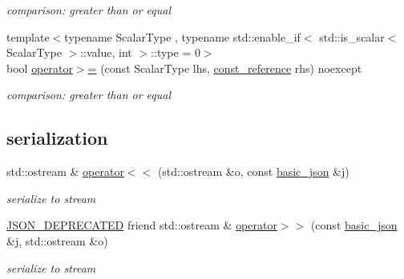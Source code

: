 \begin{DoxyCompactItemize}
\begin{DoxyCompactList}\small\item\em comparison\+: greater than or equal \end{DoxyCompactList}\item 
{\footnotesize template$<$typename Scalar\+Type , typename std\+::enable\+\_\+if$<$ std\+::is\+\_\+scalar$<$ Scalar\+Type $>$\+::value, int $>$\+::type  = 0$>$ }\\bool \hyperlink{classnlohmann_1_1basic__json_a5ee0e3e8afc7cbd932d6ed66418fa80a}{operator$>$=} (const Scalar\+Type lhs, \hyperlink{classnlohmann_1_1basic__json_a4057c5425f4faacfe39a8046871786ca}{const\+\_\+reference} rhs) noexcept
\begin{DoxyCompactList}\small\item\em comparison\+: greater than or equal \end{DoxyCompactList}\end{DoxyCompactItemize}
\subsection*{serialization}
\begin{DoxyCompactItemize}
\item 
std\+::ostream \& \hyperlink{classnlohmann_1_1basic__json_a5e34c5435e557d0bf666bd7311211405}{operator$<$$<$} (std\+::ostream \&o, const \hyperlink{classnlohmann_1_1basic__json}{basic\+\_\+json} \&j)
\begin{DoxyCompactList}\small\item\em serialize to stream \end{DoxyCompactList}\item 
\hyperlink{json_8hpp_a584fd8f49cd7f4ecf5baba15b5b53cdd}{J\+S\+O\+N\+\_\+\+D\+E\+P\+R\+E\+C\+A\+T\+ED} friend std\+::ostream \& \hyperlink{classnlohmann_1_1basic__json_a9e06deabe69262c3ffc5533d32856983}{operator$>$$>$} (const \hyperlink{classnlohmann_1_1basic__json}{basic\+\_\+json} \&j, std\+::ostream \&o)
\begin{DoxyCompactList}\small\item\em serialize to stream \end{DoxyCompactList}\end{DoxyCompactItemize}
